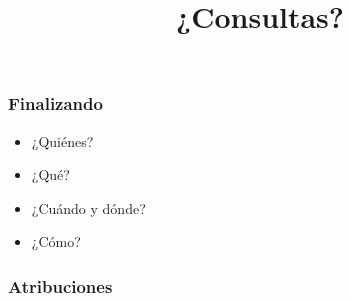 \documentclass[11pt,a4paper,spanish]{beamer}
\begin{document}
\begin{frame}

    \frametitle{Finalizando}

\begin{itemize}

\item ¿Quiénes?

\item ¿Qué?

\item ¿Cuándo y dónde?

\item ¿Cómo?

\end{itemize}

\end{frame}

\begin{frame}

\title{¿Consultas?}
\maketitle

\end{frame}

\begin{frame}%

\frametitle{Atribuciones}


\tiny

\end{frame}

\end{document}
